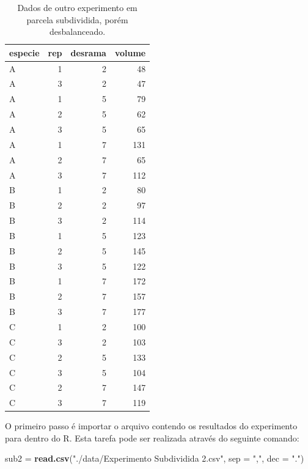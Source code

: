 \documentclass[
]{article}
\newenvironment{Shaded}{\begin{snugshade}}{\end{snugshade}}
\newcommand{\DataTypeTok}[1]{\textcolor[rgb]{0.13,0.29,0.53}{#1}}
\newcommand{\KeywordTok}[1]{\textcolor[rgb]{0.13,0.29,0.53}{\textbf{#1}}}
\newcommand{\NormalTok}[1]{#1}
\newcommand{\StringTok}[1]{\textcolor[rgb]{0.31,0.60,0.02}{#1}}
\begin{document}
\begin{table}

\caption{\label{tab:unnamed-chunk-156}Dados de outro experimento em parcela subdividida, porém desbalanceado.}
\centering
\begin{tabular}[t]{l|r|r|r}
\hline
especie & rep & desrama & volume\\
\hline
A & 1 & 2 & 48\\
\hline
A & 3 & 2 & 47\\
\hline
A & 1 & 5 & 79\\
\hline
A & 2 & 5 & 62\\
\hline
A & 3 & 5 & 65\\
\hline
A & 1 & 7 & 131\\
\hline
A & 2 & 7 & 65\\
\hline
A & 3 & 7 & 112\\
\hline
B & 1 & 2 & 80\\
\hline
B & 2 & 2 & 97\\
\hline
B & 3 & 2 & 114\\
\hline
B & 1 & 5 & 123\\
\hline
B & 2 & 5 & 145\\
\hline
B & 3 & 5 & 122\\
\hline
B & 1 & 7 & 172\\
\hline
B & 2 & 7 & 157\\
\hline
B & 3 & 7 & 177\\
\hline
C & 1 & 2 & 100\\
\hline
C & 3 & 2 & 103\\
\hline
C & 2 & 5 & 133\\
\hline
C & 3 & 5 & 104\\
\hline
C & 2 & 7 & 147\\
\hline
C & 3 & 7 & 119\\
\hline
\end{tabular}
\end{table}

O primeiro passo é importar o arquivo contendo os resultados do experimento para dentro do R. Esta tarefa pode ser realizada através do seguinte comando:

\begin{Shaded}
\begin{Highlighting}[]
\NormalTok{sub2 =}\StringTok{ }\KeywordTok{read.csv}\NormalTok{(}\StringTok{"./data/Experimento Subdividida 2.csv"}\NormalTok{, }\DataTypeTok{sep =} \StringTok{","}\NormalTok{, }\DataTypeTok{dec =} \StringTok{"."}\NormalTok{)}
\end{Highlighting}
\end{Shaded}
\end{document}
